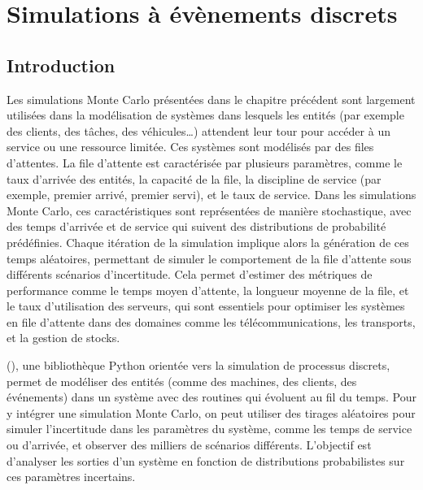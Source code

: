 \chapter{Simulations à évènements discrets}
    \section{Introduction}
        Les simulations Monte Carlo présentées dans le chapitre précédent sont largement utilisées dans la modélisation de systèmes dans lesquels les entités (par exemple des clients, des tâches, des véhicules…) attendent leur tour pour accéder à un service ou une ressource limitée. Ces systèmes sont modélisés par des files d'attentes. La file d'attente est caractérisée par plusieurs paramètres, comme le taux d'arrivée des entités, la capacité de la file, la discipline de service (par exemple, premier arrivé, premier servi), et le taux de service. Dans les simulations Monte Carlo, ces caractéristiques sont représentées de manière stochastique, avec des temps d'arrivée et de service qui suivent des distributions de probabilité prédéfinies. Chaque itération de la simulation implique alors la génération de ces temps aléatoires, permettant de simuler le comportement de la file d'attente sous différents scénarios d'incertitude. Cela permet d'estimer des métriques de performance comme le temps moyen d'attente, la longueur moyenne de la file, et le taux d'utilisation des serveurs, qui sont essentiels pour optimiser les systèmes en file d'attente dans des domaines comme les télécommunications, les transports, et la gestion de stocks.
    
         (\cite{Simpy2023}), une bibliothèque Python orientée vers la simulation de processus discrets, permet de modéliser des entités (comme des machines, des clients, des événements) dans un système avec des routines qui évoluent au fil du temps. Pour y intégrer une simulation Monte Carlo, on peut utiliser des tirages aléatoires pour simuler l'incertitude dans les paramètres du système, comme les temps de service ou d'arrivée, et observer des milliers de scénarios différents. L’objectif est d’analyser les sorties d’un système en fonction de distributions probabilistes sur ces paramètres incertains.

